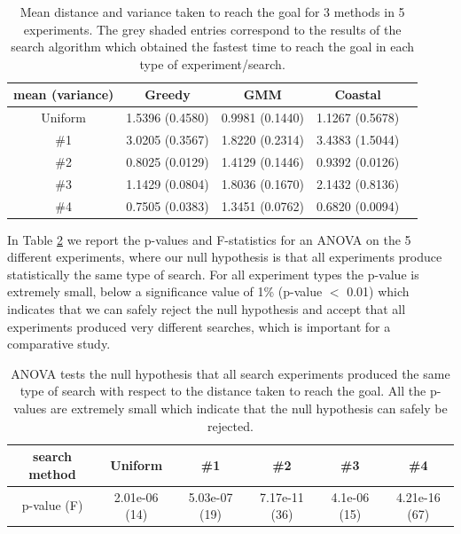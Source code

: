 \begin{table}[h!]
 \centering
  \begin{tabular}{c|c|c|c|c|}     
     mean (variance)   &  Greedy      &     GMM        &    Coastal     \\\hline
       Uniform         &   1.5396 (0.4580)  & 0.9981 (0.1440) \cellcolor{Gray} & 1.1267 (0.5678)  \\
	\#1            &   3.0205 (0.3567)  & 1.8220 (0.2314) \cellcolor{Gray} & 3.4383 (1.5044) \\
	\#2            &   0.8025 (0.0129) \cellcolor{Gray} & 1.4129 (0.1446) & 0.9392 (0.0126)  \\
	\#3            &   1.1429 (0.0804) \cellcolor{Gray} & 1.8036 (0.1670) & 2.1432 (0.8136)  \\
	\#4            &   0.7505 (0.0383)  & 1.3451 (0.0762) & 0.6820 (0.0094) \cellcolor{Gray}
 \end{tabular}
  \caption{Mean distance and variance taken to reach the goal for 3 methods in 5 experiments. The grey shaded entries correspond to the results of the search algorithm 
  which obtained the fastest time to reach the goal in each type of experiment/search.}
  \label{tab:mean-var-distance}
\end{table}

In Table \ref{tab:anova-1} we report the p-values and F-statistics for an ANOVA on the 5 different experiments, where our 
null hypothesis is that all experiments produce statistically the same type of search. For all experiment types the p-value 
is extremely small, below a significance value of 1\% (p-value $<$ 0.01) which indicates that we can safely reject the 
null hypothesis and accept that all experiments produced very different searches, which is important for a 
comparative study.

\begin{table}[h!]
 \centering
  \begin{tabular}{c|c|c|c|c|c|}
   search method &  Uniform       &   \#1	   & 	\#2	     & 	    \#3	       &   \#4 \\ \hline
   p-value (F)   &  2.01e-06 (14) & 5.03e-07 (19) &  7.17e-11 (36) &  4.1e-06 (15) &  4.21e-16 (67)
 \end{tabular}

 \caption{ANOVA tests the null hypothesis that all search experiments produced the same type of search with respect to the distance taken to reach the goal. 
 All the p-values are extremely small which indicate that the null hypothesis can safely be rejected.}
 \label{tab:anova-1}
\end{table}

